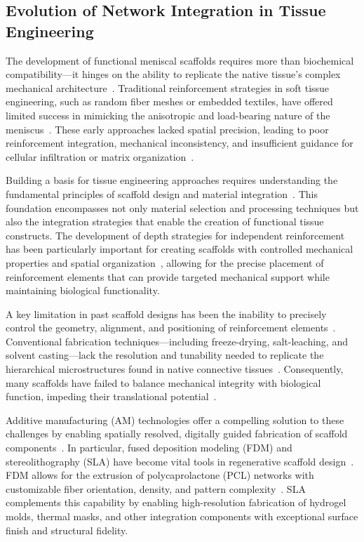 \subsection{Evolution of Network Integration in Tissue Engineering}

The development of functional meniscal scaffolds requires more than biochemical compatibility—it hinges on the ability to replicate the native tissue's complex mechanical architecture~\cite{morejon2020compressiveproperties}. Traditional reinforcement strategies in soft tissue engineering, such as random fiber meshes or embedded textiles, have offered limited success in mimicking the anisotropic and load-bearing nature of the meniscus~\cite{abdelgaied2015comparisonbiomechanical}. These early approaches lacked spatial precision, leading to poor reinforcement integration, mechanical inconsistency, and insufficient guidance for cellular infiltration or matrix organization~\cite{elkommos2024developmentimproved, elkommos2025hybridhydrogels}.

Building a basis for tissue engineering approaches requires understanding the fundamental principles of scaffold design and material integration~\cite{cengiz2016buildingbasis}. This foundation encompasses not only material selection and processing techniques but also the integration strategies that enable the creation of functional tissue constructs. The development of depth strategies for independent reinforcement has been particularly important for creating scaffolds with controlled mechanical properties and spatial organization~\cite{chendepthstraindependent}, allowing for the precise placement of reinforcement elements that can provide targeted mechanical support while maintaining biological functionality.

A key limitation in past scaffold designs has been the inability to precisely control the geometry, alignment, and positioning of reinforcement elements~\cite{zhang20173dprintedpolyecaprolactone}. Conventional fabrication techniques—including freeze-drying, salt-leaching, and solvent casting—lack the resolution and tunability needed to replicate the hierarchical microstructures found in native connective tissues~\cite{woodruff2010returnforgotten}. Consequently, many scaffolds have failed to balance mechanical integrity with biological function, impeding their translational potential~\cite{elkommos2025hybridhydrogels}.

Additive manufacturing (AM) technologies offer a compelling solution to these challenges by enabling spatially resolved, digitally guided fabrication of scaffold components~\cite{zhang20173dprintedpolyecaprolactone}. In particular, fused deposition modeling (FDM) and stereolithography (SLA) have become vital tools in regenerative scaffold design~\cite{elkommos2024developmentimproved,elkommos2025hybridhydrogels}. FDM allows for the extrusion of polycaprolactone (PCL) networks with customizable fiber orientation, density, and pattern complexity~\cite{woodruff2010returnforgotten}. SLA complements this capability by enabling high-resolution fabrication of hydrogel molds, thermal masks, and other integration components with exceptional surface finish and structural fidelity.


